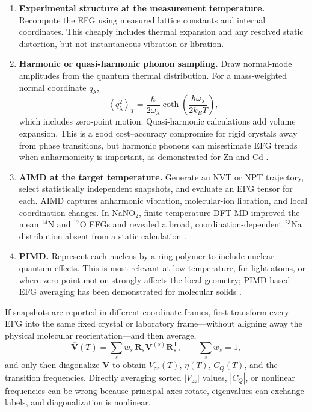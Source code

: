 \documentclass[10pt]{article}
\newcommand{\V}{\mathbf{V}}
\begin{document}
\begin{enumerate}
 \item \textbf{Experimental structure at the measurement temperature.}  Recompute the EFG using measured lattice constants and internal coordinates.  This cheaply includes thermal expansion and any resolved static distortion, but not instantaneous vibration or libration.

 \item \textbf{Harmonic or quasi-harmonic phonon sampling.}  Draw normal-mode amplitudes from the quantum thermal distribution.  For a mass-weighted normal coordinate $q_\lambda$,
 \begin{equation}
  \left\langle q_\lambda^2\right\rangle_T=
  \frac{\hbar}{2\omega_\lambda}
  \coth\!\left(\frac{\hbar\omega_\lambda}{2k_BT}\right),
 \end{equation}
 which includes zero-point motion.  Quasi-harmonic calculations add volume expansion.  This is a good cost--accuracy compromise for rigid crystals away from phase transitions, but harmonic phonons can misestimate EFG trends when anharmonicity is important, as demonstrated for Zn and Cd \cite{nikolaevZnCd,haas}.

 \item \textbf{AIMD at the target temperature.}  Generate an NVT or NPT trajectory, select statistically independent snapshots, and evaluate an EFG tensor for each.  AIMD captures anharmonic vibration, molecular-ion libration, and local coordination changes.  In NaNO$_2$, finite-temperature DFT-MD improved the mean $^{14}$N and $^{17}$O EFGs and revealed a broad, coordination-dependent $^{23}$Na distribution absent from a static calculation \cite{wagle}.

 \item \textbf{PIMD.}  Represent each nucleus by a ring polymer to include nuclear quantum effects.  This is most relevant at low temperature, for light atoms, or where zero-point motion strongly affects the local geometry; PIMD-based EFG averaging has been demonstrated for molecular solids \cite{dracinsky}.
\end{enumerate}

If snapshots are reported in different coordinate frames, first transform every EFG into the same fixed crystal or laboratory frame---without aligning away the physical molecular reorientation---and then average,
\begin{equation}
 \overline{\V}(T)=\sum_s w_s\,\mathbf R_s\V^{(s)}\mathbf R_s^{\mathsf T},
 \qquad \sum_s w_s=1,
 \label{eq:tensoravg}
\end{equation}
and only then diagonalize $\overline{\V}$ to obtain $V_{zz}(T)$, $\eta(T)$, $C_Q(T)$, and the transition frequencies.  Directly averaging sorted $|V_{zz}|$ values, $|C_Q|$, or nonlinear frequencies can be wrong because principal axes rotate, eigenvalues can exchange labels, and diagonalization is nonlinear.
\end{document}
